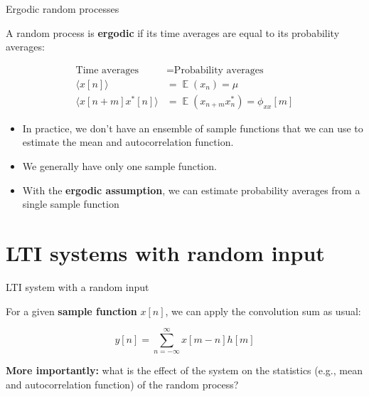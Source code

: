 \documentclass[10pt]{beamer}
\DeclareMathOperator{\E}{\mathbb{E}} %
\begin{document}
\begin{frame}{Ergodic random processes}

A random process is \textbf{ergodic} if its time averages are equal to its probability averages:

\begin{align*}
\text{Time averages} &= \text{Probability averages} \\
\langle x[n] \rangle &= \E(x_n) = \mu \tag{expected value} \\
\langle x[n+m]x^*[n] \rangle &= \E(x_{n+m}x_n^*) = \phi_{xx}[m] \tag{autocorrelation function}
\end{align*}

\begin{itemize}
	\pause\item In practice, we don't have an ensemble of sample functions that we can use to estimate the mean and autocorrelation function.
	\pause\item We generally have only one sample function.
	\pause\item With the \textbf{ergodic assumption}, we can estimate probability averages from a single sample function
\end{itemize}

\end{frame}

%
\section{LTI systems with random input}
\begin{frame}{LTI system with a random input}
\begin{center}
\resizebox{\linewidth}{!}{}
\end{center}

\pause
For a given \textbf{sample function} $x[n]$, we can apply the convolution sum as usual:

\begin{equation*}
y[n] = \sum_{n=-\infty}^{\infty} x[m-n]h[m] 
\end{equation*}

\pause\textbf{More importantly:} what is the effect of the system on the statistics (e.g., mean and autocorrelation function) of the random process?

\end{frame}
\end{document}
